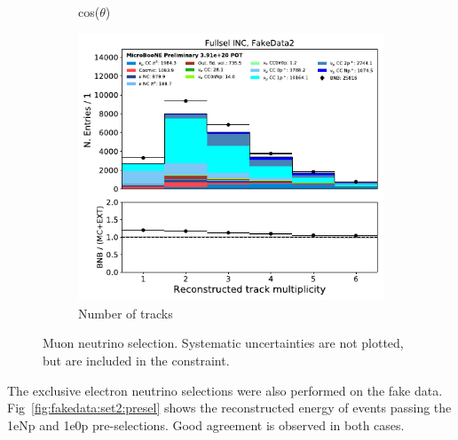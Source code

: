 \begin{figure}[H]
\begin{center}
\begin{subfigure}[b]{0.3\textwidth}
    \caption{\label{fig:fakedata:set2:numu_costheta} cos($\theta$)}
    \end{subfigure}
    \begin{subfigure}[b]{0.3\textwidth}
    \centering
    \includegraphics[width=1.00\textwidth]{Fakedata/set2/numu_ntracks.pdf}
    \caption{\label{fig:fakedata:set2:numu_ntracks} Number of tracks}
    \end{subfigure}
\caption{\label{fig:fakedata:set2:numu} Muon neutrino selection. Systematic uncertainties are not plotted, but are included in the constraint.}
\end{center}
\end{figure}

The exclusive electron neutrino selections were also performed on the fake data. Fig~\ref{fig:fakedata:set2:presel} shows the reconstructed energy of events passing the 1eNp and 1e0p pre-selections.  Good agreement is observed in both cases.

